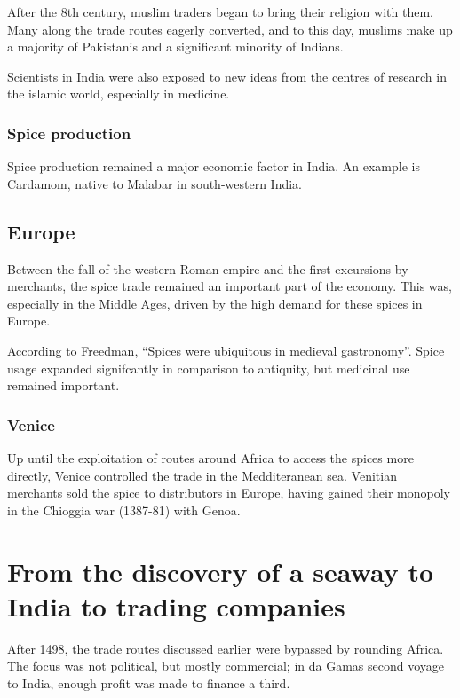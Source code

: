 \documentclass[11pt, a4paper, headings=standardclasses]{scrartcl}
\begin{document}
After the 8th century, muslim traders began to bring their religion with them.\autocite{SilkRoadIslam} Many along the trade routes eagerly converted, and to this day, muslims make up a majority of Pakistanis and a significant minority of Indians.\autocite{India} \label{Islam}

Scientists in India were also exposed to new ideas from the centres of research in the islamic world, especially in medicine.\autocite{SilkRoadIslam}

\subsubsection{Spice production}

Spice production remained a major economic factor in India. An example is Cardamom, native to Malabar in south-western India.\autocite[71]{Rome}

\subsection{Europe}

Between the fall of the western Roman empire and the first excursions by merchants, the spice trade remained an important part of the economy.\autocite{Yale} This was, especially in the Middle Ages, driven by the high demand for these spices in Europe. 

According to Freedman, ``Spices were ubiquitous in medieval gastronomy''.\autocite[3]{MST} Spice usage expanded signifcantly in comparison to antiquity, but medicinal use remained important.\autocite{RIS}

\subsubsection{Venice}

Up until the exploitation of routes around Africa to access the spices more directly, Venice controlled the trade in the Medditeranean sea. Venitian merchants sold the spice to distributors in Europe, having gained their monopoly in the Chioggia war (1387-81) with Genoa.\autocite{SpiceTrade}

\section{From the discovery of a seaway to India to trading companies}

After 1498, the trade routes discussed earlier were bypassed by rounding Africa. The focus was not political, but mostly commercial; in da Gamas second voyage to India, enough profit was made to finance a third.\autocite[Section \textit{The second voyage}]{Vasco}
\end{document}
